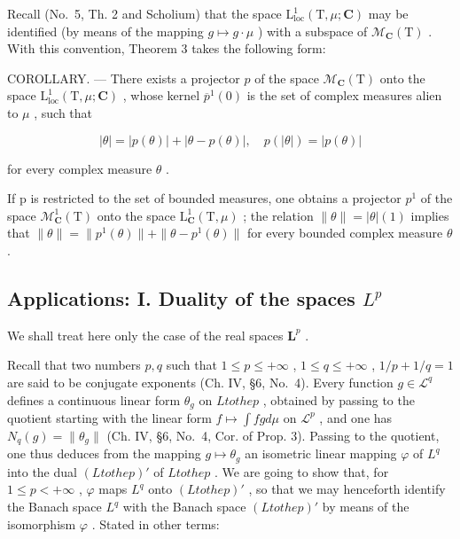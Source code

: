 Recall (No.~5, Th. 2 and Scholium) that the space \(\mathrm{L}_{\mathrm{loc}}^{1}(\mathrm{T},\mu;\mathbf{C})\) may be identified (by means of the mapping \(g\mapsto g\cdot\mu\) ) with a subspace of \(\mathcal{M}_{\mathbf{C}}(\mathrm{T})\) . With this convention, Theorem 3 takes the following form:

COROLLARY. --- There exists a projector \(p\) of the space \(\mathcal{M}_{\mathbf{C}}(\mathrm{T})\) onto the space \(\mathrm{L}_{\mathrm{loc}}^{1}(\mathrm{T},\mu ;\mathbf{C})\) , whose kernel \(\overline{p}^{1}(0)\) is the set of complex measures alien to \(\mu\) , such that

\[
| \theta | = | p (\theta) | + | \theta - p (\theta) |, \quad p (| \theta |) = | p (\theta) |
\]

for every complex measure \(\theta\) .

If p is restricted to the set of bounded measures, one obtains a projector \(p^{1}\) of the space \(\mathcal{M}_{\mathbf{C}}^{1}(\mathrm{T})\) onto the space \(\mathrm{L}_{\mathbf{C}}^{1}(\mathrm{T},\mu)\) ; the relation \(\|\theta\|=|\theta|(1)\) implies that \(\|\theta\|=\|p^{1}(\theta)\|+\|\theta-p^{1}(\theta)\|\) for every bounded complex measure \(\theta\) .

\subsection{\texorpdfstring{Applications: I. Duality of the spaces \(L^{p}\)}{Applications: I. Duality of the spaces L to the p}}

We shall treat here only the case of the real spaces \(\mathbf{L}^p\) .

Recall that two numbers \(p, q\) such that \(1 \leqslant p \leqslant +\infty\) , \(1 \leqslant q \leqslant +\infty\) , \(1/p + 1/q = 1\) are said to be conjugate exponents (Ch. IV, §6, No.~4). Every function \(g \in \mathcal{L}^q\) defines a continuous linear form \(\theta_g\) on \(L to the p\) , obtained by passing to the quotient starting with the linear form \(f \mapsto \int fg d\mu\) on \(\mathcal{L}^p\) , and one has \(N_q(g) = \| \theta_g \|\) (Ch. IV, §6, No.~4, Cor. of Prop. 3). Passing to the quotient, one thus deduces from the mapping \(g \mapsto \theta_g\) an isometric linear mapping \(\varphi\) of \(L^q\) into the dual \((L to the p)'\) of \(L to the p\) . We are going to show that, for \(1 \leqslant p < +\infty\) , \(\varphi\) maps \(L^q\) onto \((L to the p)'\) , so that we may henceforth identify the Banach space \(L^q\) with the Banach space \((L to the p)'\) by means of the isomorphism \(\varphi\) . Stated in other terms:

